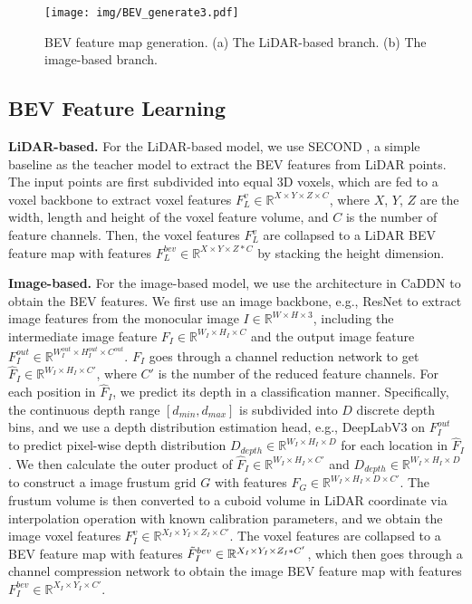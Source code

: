 \documentclass[runningheads]{llncs}
\begin{document}
\begin{figure*}[t]
  \centering
  \texttt{[image: img/BEV\_generate3.pdf]}
  \caption{BEV feature map generation. (a) The LiDAR-based branch. (b) The image-based branch.}
  \label{fig:bev generation}
\end{figure*}

\subsection{BEV Feature Learning}
\textbf{LiDAR-based.} 
For the LiDAR-based model, we use SECOND \cite{second}, a simple baseline as the teacher model to extract the BEV features from LiDAR points.
The input points are first subdivided into equal 3D voxels, which are fed to a voxel backbone to extract voxel features $F^{v}_{L}\in \mathbb{R}^{X \times Y \times Z \times C}$, where $X$, $Y$, $Z$ are the width, length and height of the voxel feature volume, and $C$ is the number of feature channels. 
Then, the voxel features $F^{v}_{L}$ are collapsed to a LiDAR BEV feature map with features $F^{bev}_{L} \in \mathbb{R}^{X \times Y \times Z*C}$ by stacking the height dimension. 

\noindent\textbf{Image-based.} 
For the image-based model, we use the architecture in CaDDN \cite{CADDN} to obtain the BEV features. 
We first use an image backbone, e.g., ResNet \cite{resnet} to extract image features from the monocular image $I \in \mathbb{R}^{W\times H\times 3}$, including the intermediate image feature $F_I\in\mathbb{R}^{W_I\times H_I \times C}$ and the output image feature $F_I^{out}\in\mathbb{R}^{W_I^{out}\times H_I^{out} \times C^{out}}$.
$F_I$ goes through a channel reduction network to get $\hat{F}_{I}\in \mathbb{R}^{W_{I}\times H_{I}\times C'}$, where $C'$ is the number of the reduced feature channels.
For each position in $\hat{F}_I$, we predict its depth in a classification manner.
Specifically, the continuous depth range $[d_{min},d_{max}]$ is subdivided into $D$ discrete depth bins, and we use a depth distribution estimation head, e.g., DeepLabV3 \cite{deeplab} on $F_I^{out}$ to predict pixel-wise depth distribution $D_{depth}\in\mathbb{R}^{W_I\times H_I \times D}$ for each location in $\hat{F}_I$.
We then calculate the outer product of $\hat{F}_I\in\mathbb{R}^{W_I\times H_I \times C'}$ and $D_{depth}\in\mathbb{R}^{W_I\times H_I \times D}$ to construct a image frustum grid $G$ with features $F_G \in \mathbb{R}^{W_{I}\times H_{I}\times D\times C'}$.
The frustum volume is then converted to a cuboid volume in LiDAR coordinate via interpolation operation with known calibration parameters, and we obtain the image voxel features $F_{I}^{v} \in \mathbb{R}^{X_I \times Y_I \times Z_I \times C'}$.
The voxel features are collapsed to a BEV feature map with features $\Tilde{F}^{bev}_{I} \in \mathbb{R}^{X_I \times Y_I \times Z_I * C'}$, which then goes through a channel compression network to obtain the image BEV feature map with features $F^{bev}_{I} \in \mathbb{R}^{X_I \times Y_I \times C'}$.
\end{document}
